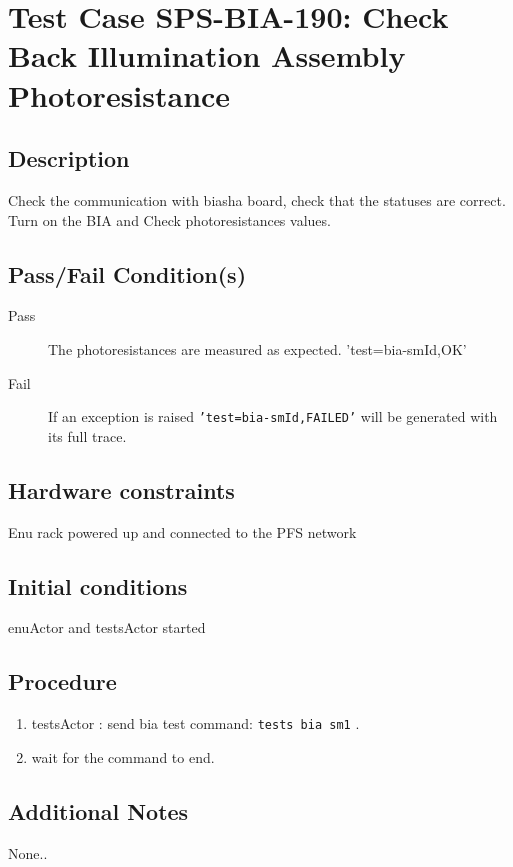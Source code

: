 \section{Test Case SPS-BIA-190: Check Back Illumination Assembly Photoresistance}

\subsection{Description}

Check the communication with biasha board, check that the statuses are correct.
Turn on the BIA and Check photoresistances values.

\subsection{Pass/Fail Condition(s)}

\begin{description}
\item [Pass] The photoresistances are measured as expected. {'test=bia-smId,OK'}
\item [Fail] If an exception is raised \texttt{'test=bia-smId,FAILED'} will be generated with its full trace.
\end{description}

\subsection{Hardware constraints}

Enu rack powered up and connected to the PFS network

\subsection{Initial conditions}
enuActor and testsActor started

\subsection{Procedure}

\begin{enumerate}
    \item testsActor : send bia test command: \texttt{tests bia sm1} .
    \item wait for the command to end.
\end{enumerate}



\subsection{Additional Notes}

None..